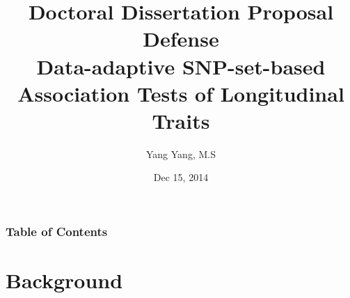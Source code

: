 \documentclass[compress]{beamer}
\begin{document}
\title[Hypothesis Testing] %
{Doctoral Dissertation Proposal Defense\\Data-adaptive SNP-set-based Association Tests of Longitudinal Traits }
\author[ Yang Yang, M.S] %
{Yang Yang, M.S}
\date[Dec.15 2014] %
{Dec 15, 2014}


\frame{\titlepage}


\begin{frame}
\frametitle{Table of Contents}
\tableofcontents
\end{frame}


\section{Background}
\end{document}
